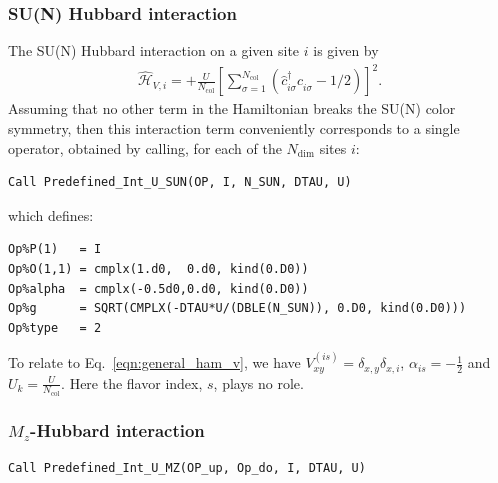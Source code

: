 \subsubsection{SU(N) Hubbard interaction}
\label{Hubbard_SUN_HS.eq}
The SU(N) Hubbard interaction on a given site $i$ is given by 
\begin{align}
\hat{\mathcal{H}}_{V,i} =
+ \frac{U}{N_{\mathrm{col}}}\left[
\sum\limits_{\sigma=1}^{N_{\mathrm{col}}}
\left(  \hat{c}^{\dagger}_{i \sigma} \hat{c}^{\phantom\dagger}_{i\sigma}  -1/2 \right) \right]^{2}.
\end{align} 
Assuming that no other term in the Hamiltonian breaks the SU(N) color symmetry, then this interaction term conveniently corresponds to  a single operator, obtained by calling, for each of the $N_{\mathrm{dim}}$ sites $i$:
\begin{lstlisting}[style=fortran]
Call Predefined_Int_U_SUN(OP, I, N_SUN, DTAU, U)
\end{lstlisting}
which defines:

\begin{lstlisting}[style=fortran,ndkeywords={type},ndkeywordstyle=\color{black}\ttfamily]
Op%P(1)   = I
Op%O(1,1) = cmplx(1.d0,  0.d0, kind(0.D0))
Op%alpha  = cmplx(-0.5d0,0.d0, kind(0.D0))
Op%g      = SQRT(CMPLX(-DTAU*U/(DBLE(N_SUN)), 0.D0, kind(0.D0))) 
Op%type   = 2

\end{lstlisting}

To relate to  Eq.~\eqref{eqn:general_ham_v}, we have $V_{x y}^{(is)} =  \delta_{x,y} \delta_{x,i}$, $\alpha_{is} = -\frac{1}{2}$ and $U_{k} =  \frac{U}{N_{\mathrm{col}}}$.   Here  the flavor index, $s$,  plays no role. 


\subsubsection{$M_z$-Hubbard interaction}

\begin{lstlisting}[style=fortran]
Call Predefined_Int_U_MZ(OP_up, Op_do, I, DTAU, U)
\end{lstlisting}

